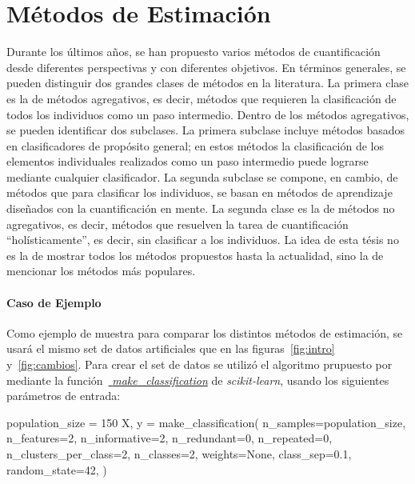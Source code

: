 \chapter{Métodos de Estimación}\label{estimacion}

Durante los últimos años, se han propuesto varios métodos de cuantificación
desde diferentes perspectivas y con diferentes objetivos. En términos generales,
se pueden distinguir dos grandes clases de métodos en la literatura. La primera
clase es la de métodos agregativos, es decir, métodos que requieren la
clasificación de todos los individuos como un paso intermedio. Dentro de los
métodos agregativos, se pueden identificar dos subclases. La primera subclase
incluye métodos basados en clasificadores de propósito general; en estos métodos
la clasificación de los elementos individuales realizados como un paso
intermedio puede lograrse mediante cualquier clasificador. La segunda subclase
se compone, en cambio, de métodos que para clasificar los individuos, se basan
en métodos de aprendizaje diseñados con la cuantificación en mente. La segunda
clase es la de métodos no agregativos, es decir, métodos que resuelven la tarea
de cuantificación “holísticamente”, es decir, sin clasificar a los individuos.
La idea de esta tésis no es la de mostrar todos los métodos propuestos hasta la
actualidad, sino la de mencionar los métodos más populares.

\subsubsection{Caso de Ejemplo}\label{estimacion:ejemplo}

Como ejemplo de muestra para comparar los distintos métodos de estimación, se usará
el mismo set de datos artificiales que en las figuras~\ref{fig:intro}
y~\ref{fig:cambios}. Para crear el set de datos se utilizó el algoritmo
prupuesto por~\citet{Guyon2003DesignOE} mediante la
función~\href{https://scikit-learn.org/stable/modules/generated/sklearn.datasets.make_classification.html}{{\it
make\_classification}} de {\it scikit-learn}, usando los siguientes parámetros
de entrada:

\begin{python}
population_size = 150
X, y = make_classification(
    n_samples=population_size, n_features=2, n_informative=2,
    n_redundant=0, n_repeated=0, n_clusters_per_class=2, 
    n_classes=2, weights=None, class_sep=0.1, random_state=42,
)
\end{python}

